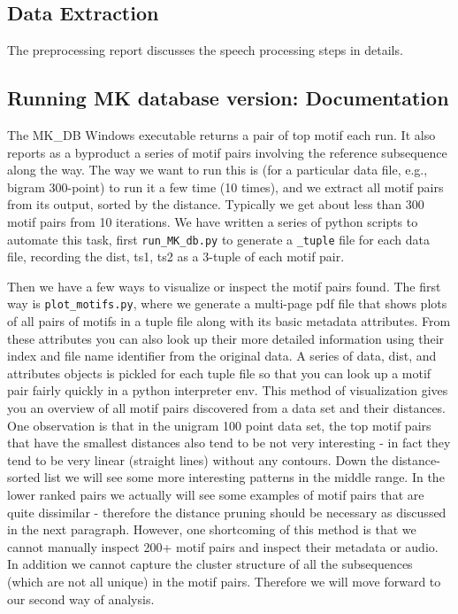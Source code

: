 \documentclass[11pt]{article}
\begin{document}
\subsection {Data Extraction}
The preprocessing report discusses the speech processing steps in details. 

\subsection{Running MK database version: Documentation}
The MK\_DB Windows executable returns a pair of top motif each run. It also reports as a byproduct a series of motif pairs involving the reference subsequence along the way. The way we want to run this is (for a particular data file, e.g., bigram 300-point) to run it a few time (10 times), and we extract all motif pairs from its output, sorted by the distance. Typically we get about less than 300 motif pairs from 10 iterations. We have written a series of python scripts to automate this task, first \texttt{run\_MK\_db.py} to generate a \texttt{\_tuple} file for each data file, recording the dist, ts1, ts2 as a 3-tuple of each motif pair. 

Then we have a few ways to visualize or inspect the motif pairs found. The first way is \texttt{plot\_motifs.py}, where we generate a multi-page pdf file that shows plots of all pairs of motifs in a tuple file along with its basic metadata attributes. From these attributes you can also look up their more detailed information using their index and file name identifier from the original data. A series of data, dist, and attributes objects is pickled for each tuple file so that you can look up a motif pair fairly quickly in a python interpreter env. This method of visualization gives you an overview of all motif pairs discovered from a data set and their distances. One observation is that in the unigram 100 point data set, the top motif pairs that have the smallest distances also tend to be not very interesting - in fact they tend to be very linear (straight lines) without any contours. Down the distance-sorted list   we will see some more interesting patterns in the middle range. In the lower ranked pairs we actually will see some examples of motif pairs that are quite dissimilar - therefore the distance pruning should be necessary as discussed in the next paragraph. However, one shortcoming of this method is that we cannot manually inspect 200+ motif pairs and inspect their metadata or audio. In addition we cannot capture the cluster structure of all the subsequences (which are not all unique) in the motif pairs. Therefore we will move forward to our second way of analysis. 
\end{document}
